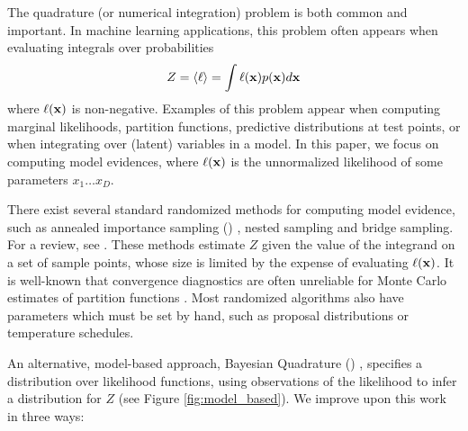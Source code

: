 \documentclass{article}
\begin{document}
The quadrature (or numerical integration) problem is both common and important.  In machine learning applications, this problem often appears when evaluating integrals over probabilities
\begin{equation}\label{eq:ev}
Z = \inty{\lfn} = \int \lfn(\vlfv) p(\vlfv) d\vlfv
\end{equation}
where $\ell(\vlfv)$ is non-negative.  Examples of this problem appear when computing marginal likelihoods, partition functions, predictive distributions at test points, or when integrating over (latent) variables in a model.  In this paper, we focus on computing model evidences, where $\ell(\vlfv)$ is the unnormalized likelihood of some parameters $x_1 \dots x_D$.


There exist several standard randomized methods for computing model evidence, such as annealed importance sampling () \citep{neal2001annealed}, nested sampling \citep{skilling2004nested} and bridge sampling.  For a review, see \citet{chen2000monte}.   These methods estimate $Z$ given the value of the integrand on a set of sample points, whose size is limited by the expense of evaluating $\ell(\vlfv)$.  It is well-known that convergence diagnostics are often unreliable for Monte Carlo estimates of partition functions  \citep{NealMC, brooks1998convergence, cowles1999possible}.  Most randomized algorithms also have parameters which must be set by hand, such as proposal distributions or temperature schedules.


An alternative, model-based approach, Bayesian Quadrature () \citep{BZHermiteQuadrature, BZMonteCarlo}, specifies a distribution over likelihood functions, using observations of the likelihood to infer a distribution for $Z$ (see Figure \ref{fig:model_based}). We improve upon this work in three ways:
\end{document}
